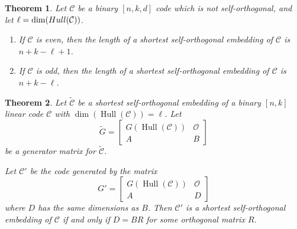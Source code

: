 \documentclass[10pt,a4paper]{amsart}
\newtheorem{theorem}{Theorem}
\begin{document}
\begin{theorem} \label{thm-even-odd-even}
Let $\mathcal C$ be a binary $[n, k, d]$ code which is not self-orthogonal, and let $\ell =\dim({\rm{Hull}}(\mathcal C))$.
\begin{enumerate}
    \item[(i)] If $\mathcal{C}$ is even, then the length of a shortest self-orthogonal embedding of $\mathcal{C}$ is $n+k-\ell+1$.
    \item[(ii)] If $\mathcal{C}$ is odd, then the length of a shortest self-orthogonal embedding of $\mathcal{C}$ is $n+k-\ell$.
\end{enumerate}
\end{theorem}

\begin{theorem}\label{ortho-gene}
    Let $\tilde{\mathcal{C}}$ be a shortest self-orthogonal embedding of a binary $[n, k]$ linear code $\mathcal{C}$ with $\dim(\operatorname{Hull}(\mathcal{C}))=\ell$. Let 
    \[
    \tilde{G} = \begin{bmatrix}
        G(\operatorname{Hull}(\mathcal{C})) & \mathcal{O} \\A & B
    \end{bmatrix}
    \]
    be a generator matrix for $\tilde{\mathcal{C}}$.  

    Let $\mathcal{C}'$ be the code generated by the matrix 
    \[
    G' = \begin{bmatrix}
        G(\operatorname{Hull}(\mathcal{C})) & \mathcal{O} \\A & D
    \end{bmatrix}
    \]
    where $D$ has the same dimensions as $B$.  Then $\mathcal{C}'$ is a shortest self-orthogonal embedding of $\mathcal{C}$ if and only if $D = BR$ for some orthogonal matrix $R$.
\end{theorem}
\end{document}
